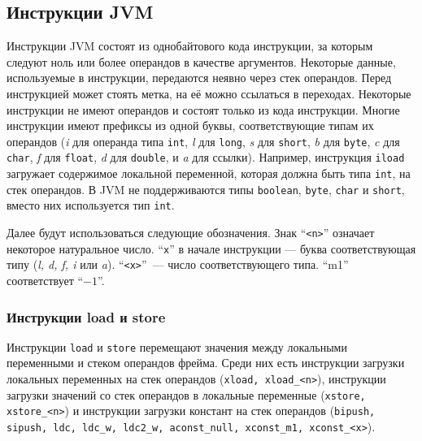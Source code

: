 \subsection{Инструкции JVM}
Инструкции JVM состоят из однобайтового кода инструкции, за которым следуют ноль или более операндов в качестве аргументов. Некоторые данные, используемые в инструкции, передаются неявно через стек операндов. Перед инструкцией может стоять метка, на её можно ссылаться в переходах. Некоторые инструкции не имеют операндов и состоят только из кода инструкции. Многие инструкции имеют префиксы из одной буквы, соответствующие типам их операндов ({\it i} для операнда типа \texttt{int}, {\it l} для \texttt{long}, {\it s} для \texttt{short}, {\it b} для \texttt{byte}, {\it c} для \texttt{char}, {\it f} для \texttt{float}, {\it d} для \texttt{double}, и {\it a} для ссылки). Например, инструкция \texttt{iload} загружает содержимое локальной переменной, которая должна быть типа \texttt{int}, на стек операндов. В JVM не поддерживаются типы \texttt{boolean}, \texttt{byte}, \texttt{char} и \texttt{short}, вместо них используется тип \texttt{int}. 


Далее будут использоваться следующие обозначения. Знак ``\texttt{<n>}'' \space означает некоторое натуральное число. ``\texttt{x}'' \space в начале инструкции --- буква соответствующая типу (\textit{l, d, f, i} или \textit{a}). ``\texttt{<x>}''~--- число соответствующего типа. ``m1'' соответствует ``$-1$''.

\subsubsection*{Инструкции load и store}
Инструкции \texttt{load} и \texttt{store} перемещают значения между локальными переменными и стеком операндов фрейма. Среди них есть инструкции загрузки локальных переменных на стек операндов (\texttt{xload, xload\_<n>}), инструкции загрузки значений со стек операндов в локальные переменные (\texttt{xstore, xstore\_<n>}) и инструкции загрузки констант на стек операндов (\texttt{bipush, sipush, ldc, ldc\_w, ldc2\_w, aconst\_null, xconst\_m1, xconst\_<x>}). 

